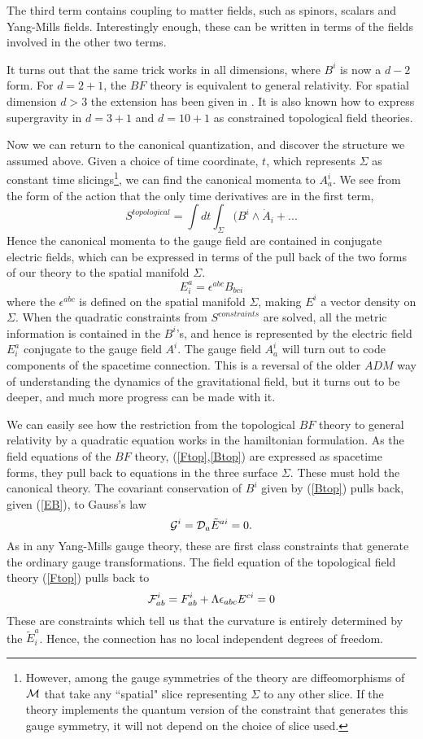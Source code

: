 \documentclass[12pt]{article}
\newcommand{\f}{\begin{equation}}
\newcommand{\ff}{\end{equation}}
\begin{document}
The third term contains coupling to matter fields, such as spinors, scalars and Yang-Mills fields. 
Interestingly enough, these can be written in terms of the fields involved
in the other two terms\cite{CDJ}. 

It turns out that the same trick works in all dimensions, where $B^i$ is now a $d-2$ form. 
For $d=2+1$, the $BF$ theory is equivalent to general relativity\cite{2+1}. For spatial
dimension $d>3$ the extension has been given in \cite{higher}.  It is also known
how to express supergravity in $d=3+1$ \cite{super} and $d=10+1$ \cite{11d}
as constrained topological field theories.  

Now we can return to the canonical quantization, and discover the structure
we assumed above.  Given a choice of time 
coordinate, $t$, which represents $\Sigma$ as constant time 
slicings\footnote{However, among the gauge symmetries of the theory are diffeomorphisms of 
$\cal M$ that take any ``spatial" slice representing  $\Sigma$ to any other slice. 
If the theory implements the quantum version of the constraint that generates this 
gauge symmetry, it will not depend on the choice of slice used.}, we can find the 
canonical momenta to $A^i_a$.  We see from the form of the action that the only time 
derivatives are in the first term, 
\f
S^{topological}=\int dt \int_{\Sigma}   ( B^i \wedge \dot{A}_i + ...
\ff
Hence the canonical momenta to the gauge field are contained 
in conjugate electric fields, which can be expressed in terms of the pull back
of the two forms of our theory to the spatial manifold  $\Sigma$. 
\f
E^a_i = \epsilon^{abc} B_{bc i}
\label{EB}
\ff
where the  $\epsilon^{abc}$ is defined on the spatial manifold $\Sigma$, 
making $E^i$ a vector density on $\Sigma$.  
When the quadratic constraints from $S^{constraints}$ are solved, all the 
metric information is contained in the $B^i$'s, and hence 
is represented by the electric field $E^a_i$ conjugate to the gauge field $A^i$.   
The gauge field $A^i_a$ will turn out to code components of the spacetime connection.
This is a reversal of the older $ADM$ way of understanding the dynamics of the 
gravitational field, but it turns out to be deeper, and much more progress can be made with it.  

We can easily see how the restriction from the topological $BF$ theory to
general relativity by a quadratic equation works in the hamiltonian formulation.   
As the field equations of the $BF$ theory, (\ref{Ftop},\ref{Btop}) are expressed as 
spacetime forms, 
they pull back to equations in the three surface $\Sigma$. These  must
hold the canonical theory.  The covariant conservation of $B^i$
given by (\ref{Btop}) pulls back, given (\ref{EB}), to Gauss's law
\f
{\cal G}^i={\cal  D}_a \tilde{E}^{ai}=0.
\label{gauss}
\ff
As in any Yang-Mills gauge theory, these are first class constraints that generate the ordinary
gauge transformations.  The field equation of the topological field theory
(\ref{Ftop}) pulls back to
\f
{\cal F}_{ab}^i = F_{ab}^i + \Lambda \epsilon_{abc} E^{c i} =0
\label{topconstraints}
\ff
These are constraints which tell us that the curvature is entirely determined by the $\tilde{E}^a_i$.
Hence,  the connection has no local independent degrees of freedom.
\end{document}
